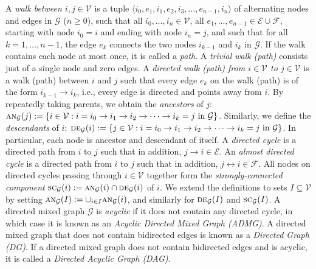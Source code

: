 \documentclass[twoside,11pt]{article}
\newcommand\C[1]{\mathcal{#1}}
\newcommand\mathbfsc[1]{\text{\normalfont\scshape#1}}
\newcommand\ansub[2]{\mathbfsc{an}_{#1}(#2)}
\newcommand\desub[2]{\mathbfsc{de}_{#1}(#2)}
\newcommand\sccsub[2]{\mathbfsc{sc}_{#1}(#2)}
\newcommand{\oto}{\leftrightarrow}
\begin{document}
A \emph{walk between $i,j\in\C{V}$} is a tuple $\langle i_0,e_1,i_1,e_2,i_3,\dots,e_{n-1},i_n \rangle$ 
of alternating nodes and edges in $\C{G}$ ($n \ge 0$), such that all $i_0,\dots,i_n \in \C{V}$,
all $e_1,\dots,e_{n-1} \in \C{E} \cup \C{F}$, starting with node $i_0=i$ and ending with node $i_n=j$,
and such that for all $k=1,\dots,n-1$, the edge $e_k$ connects the two nodes $i_{k-1}$ and
$i_k$ in $\C{G}$. If the walk contains each node at most once, it is called a \emph{path}.
A \emph{trivial walk (path)} consists just of a single node and zero edges.
A \emph{directed walk (path) from $i \in \C{V}$ to $j \in \C{V}$} is a walk (path) between $i$ and $j$ such that every edge 
$e_k$ on the walk (path) is of the form $i_{k-1} \to i_k$, i.e., every edge is directed and points away from $i$. 
By repeatedly taking parents, we obtain the \emph{ancestors} of $j$:
$\ansub{\C{G}}{j} := \{i \in \C{V} : i = i_0 \to i_1 \to i_2 \to \dots \to i_k = j \text{ in } \C{G}\}$.
Similarly, we define the \emph{descendants} of $i$: $\desub{\C{G}}{i} := \{j \in \C{V}: i = i_0 \to i_1 \to i_2 \to \dots \to i_k = j \text{ in } \C{G}\}$. In particular, each node is ancestor and descendant of itself.
A \emph{directed cycle} is a directed path from $i$ to $j$ such that in addition, $j \to i \in \C{E}$.
An \emph{almost directed cycle} is a directed path from $i$ to $j$ such that in addition, $j \oto i \in \C{F}$.
All nodes on directed cycles passing through $i \in \C{V}$ together form the \emph{strongly-connected component}
$\sccsub{\C{G}}{i}:= \ansub{\C{G}}{i} \cap \desub{\C{G}}{i}$ of $i$.
We extend the definitions to sets $I \subseteq \C{V}$ by setting $\ansub{\C{G}}{I} := \cup_{i\in I} \ansub{\C{G}}{i}$, 
and similarly for $\desub{\C{G}}{I}$ and $\sccsub{\C{G}}{I}$.  A directed mixed graph $\C{G}$ 
is \emph{acyclic} if it does not contain any directed cycle, in which case it is known as an 
\emph{Acyclic Directed Mixed Graph (ADMG)}. A directed mixed graph that does not contain 
bidirected edges is known as a \emph{Directed Graph (DG)}. If a directed mixed graph does not
contain bidirected edges and is acyclic, it is called a \emph{Directed Acyclic Graph (DAG)}.
\end{document}
